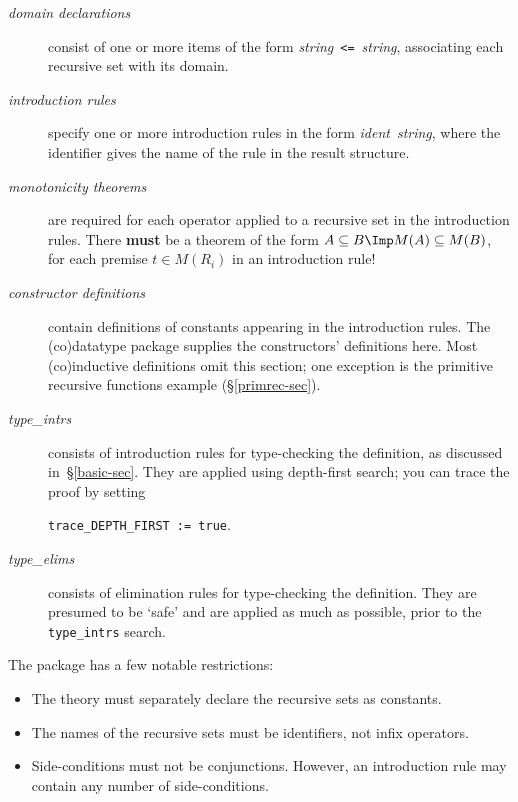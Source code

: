 \begin{description}
\item[\it domain declarations] consist of one or more items of the form
  {\it string\/}~{\tt <=}~{\it string}, associating each recursive set with
  its domain.

\item[\it introduction rules] specify one or more introduction rules in
  the form {\it ident\/}~{\it string}, where the identifier gives the name of
  the rule in the result structure.

\item[\it monotonicity theorems] are required for each operator applied to
  a recursive set in the introduction rules.  There {\bf must} be a theorem
  of the form $A\sbs B\Imp M(A)\sbs M(B)$, for each premise $t\in M(R_i)$
  in an introduction rule!

\item[\it constructor definitions] contain definitions of constants
  appearing in the introduction rules.  The (co)datatype package supplies
  the constructors' definitions here.  Most (co)inductive definitions omit
  this section; one exception is the primitive recursive functions example
  (\S\ref{primrec-sec}).

\item[\it type\_intrs] consists of introduction rules for type-checking the
  definition, as discussed in~\S\ref{basic-sec}.  They are applied using
  depth-first search; you can trace the proof by setting

  \verb|trace_DEPTH_FIRST := true|.

\item[\it type\_elims] consists of elimination rules for type-checking the
  definition.  They are presumed to be `safe' and are applied as much as
  possible, prior to the {\tt type\_intrs} search.
\end{description}

The package has a few notable restrictions:
\begin{itemize}
\item The theory must separately declare the recursive sets as
  constants.

\item The names of the recursive sets must be identifiers, not infix
operators.  

\item Side-conditions must not be conjunctions.  However, an introduction rule
may contain any number of side-conditions.
\end{itemize}


